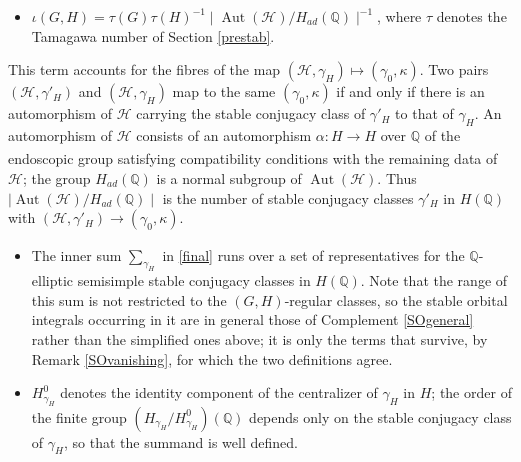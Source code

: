 \documentclass[11pt,a4paper]{article}
\theoremstyle{definition}
\theoremstyle{plain}
\theoremstyle{remark}
\theoremstyle{plain}
\DeclareMathOperator{\Aut}{Aut}
\begin{document}
\begin{itemize}
    \item $\iota(G,H) = \tau(G) \tau(H)^{-1} \mid \Aut(\mathcal{H})/H_{ad}(\mathbb{Q}) \mid^{-1}$, where $\tau$ denotes the Tamagawa number of Section \ref{prestab}.
\end{itemize}

This term accounts for the fibres of the map $(\mathcal{H}, \gamma_H) \mapsto (\gamma_0, \kappa)$. Two pairs $(\mathcal{H}, \gamma'_H)$ and $(\mathcal{H}, \gamma_H)$ map to the same $(\gamma_0, \kappa)$ if and only if there is an automorphism of $\mathcal{H}$ carrying the stable conjugacy class of $\gamma'_H$ to that of $\gamma_H$. An automorphism of $\mathcal{H}$ consists of an automorphism $\alpha: H \xrightarrow[]{} H$ over $\mathbb{Q}$ of the endoscopic group satisfying compatibility conditions with the remaining data of $\mathcal{H}$; the group $H_{ad}(\mathbb{Q})$ is a normal subgroup of $\Aut(\mathcal{H})$. Thus $\mid \Aut(\mathcal{H}) / H_{ad}(\mathbb{Q}) \mid$ is the number of stable conjugacy classes $\gamma'_H$ in $H(\mathbb{Q})$ with $(\mathcal{H}, \gamma'_H) \xrightarrow[]{} (\gamma_0, \kappa)$.

\begin{itemize}
    \item The inner sum $\sum_{\gamma_H}$ in \eqref{final} runs over a set of representatives for the $\mathbb{Q}$-elliptic semisimple stable conjugacy classes in $H(\mathbb{Q})$. Note that the range of this sum is not restricted to the $(G,H)$-regular classes, so the stable orbital integrals occurring in it are in general those of Complement \ref{SOgeneral} rather than the simplified ones above; it is only the terms that survive, by Remark \ref{SOvanishing}, for which the two definitions agree.
    \item $H_{\gamma_H}^0$ denotes the identity component of the centralizer of $\gamma_H$ in $H$; the order of the finite group $(H_{\gamma_H}/H_{\gamma_H}^0)(\mathbb{Q})$ depends only on the stable conjugacy class of $\gamma_H$, so that the summand is well defined.
\end{itemize}
\end{document}
